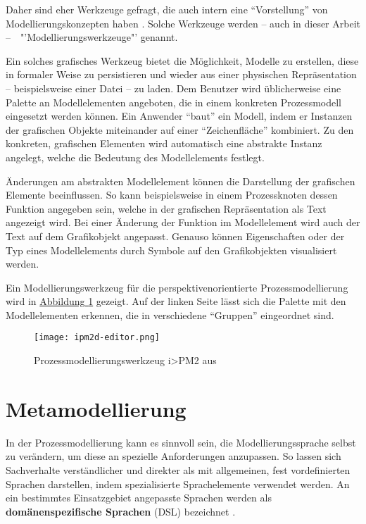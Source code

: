 \documentclass[a4paper,10pt]{sphinxmanual}
\begin{document}
Daher sind eher Werkzeuge gefragt, die auch intern eine "`Vorstellung"' von Modellierungskonzepten haben \cite{volz_werkzeugunterstutzung_2011}.
Solche Werkzeuge werden – auch in dieser Arbeit – "'Modellierungswerkzeuge"' genannt.

Ein solches grafisches Werkzeug bietet die Möglichkeit, Modelle zu erstellen, diese in formaler Weise zu persistieren und wieder aus einer physischen Repräsentation – beispielsweise einer Datei – zu laden.
Dem Benutzer wird üblicherweise eine Palette an Modellelementen angeboten, die in einem konkreten Prozessmodell eingesetzt werden können.
Ein Anwender "`baut"' ein Modell, indem er Instanzen der grafischen Objekte miteinander auf einer "`Zeichenfläche"' kombiniert.
Zu den konkreten, grafischen Elementen wird automatisch eine abstrakte Instanz angelegt, welche die Bedeutung des Modellelements festlegt.

Änderungen am abstrakten Modellelement können die Darstellung der grafischen Elemente beeinflussen.
So kann beispielsweise in einem Prozessknoten dessen Funktion angegeben sein, welche in der grafischen Repräsentation als Text angezeigt wird.
Bei einer Änderung der Funktion im Modellelement wird auch der Text auf dem Grafikobjekt angepasst.
Genauso können Eigenschaften oder der Typ eines Modellelements durch Symbole auf den Grafikobjekten visualisiert werden.

Ein Modellierungswerkzeug für die perspektivenorientierte Prozessmodellierung wird in \hyperref[grundlagen:ipm2]{Abbildung  \ref*{grundlagen:ipm2}} gezeigt.
Auf der linken Seite lässt sich die Palette mit den Modellelementen erkennen, die in verschiedene "`Gruppen"' eingeordnet sind.
\begin{figure}[htbp]
\centering
\capstart

\texttt{[image: ipm2d-editor.png]}
\caption{Prozessmodellierungswerkzeug i\textgreater{}PM2 aus \cite{roth_konzeption_2011}}\label{grundlagen:ipm2}\end{figure}


\section{Metamodellierung}
\label{grundlagen:id5}\label{grundlagen:metamodellierung}
In der Prozessmodellierung kann es sinnvoll sein, die Modellierungssprache selbst zu verändern, um diese an spezielle Anforderungen anzupassen.
So lassen sich Sachverhalte verständlicher und direkter als mit allgemeinen, fest vordefinierten Sprachen darstellen, indem spezialisierte Sprachelemente verwendet werden.
An ein bestimmtes Einsatzgebiet angepasste Sprachen werden als \textbf{domänenspezifische Sprachen} (DSL) bezeichnet \cite{clark_applied_2008}.
\end{document}
